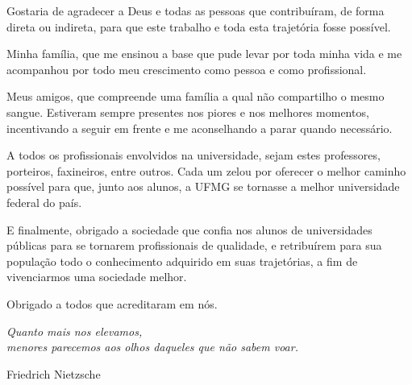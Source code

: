 \begin{agradecimentos}
Gostaria de agradecer a Deus e todas as pessoas que contribuíram, de forma direta ou indireta, para que este trabalho e toda esta trajetória fosse possível.

Minha família, que me ensinou a base que pude levar por toda minha vida e me acompanhou por todo meu crescimento como pessoa e como profissional.

Meus amigos, que compreende uma família a qual não compartilho o mesmo sangue. Estiveram sempre presentes nos piores e nos melhores momentos, incentivando a seguir em frente e me aconselhando a parar quando necessário.

A todos os profissionais envolvidos na universidade, sejam estes professores, porteiros, faxineiros, entre outros. Cada um zelou por oferecer o melhor caminho possível para que, junto aos alunos, a UFMG se tornasse a melhor universidade federal do país.

E finalmente, obrigado a sociedade que confia nos alunos de universidades públicas para se tornarem profissionais de qualidade, e retribuírem para sua população todo o conhecimento adquirido em suas trajetórias, a fim de vivenciarmos uma sociedade melhor.

Obrigado a todos que acreditaram em nós.

\end{agradecimentos}

\begin{epigrafe}
    \vspace*{\fill}
	\begin{flushright}
		\textit{Quanto mais nos elevamos,\\
		menores parecemos aos olhos daqueles que não sabem voar.}
        
        Friedrich Nietzsche
	\end{flushright}
\end{epigrafe}
